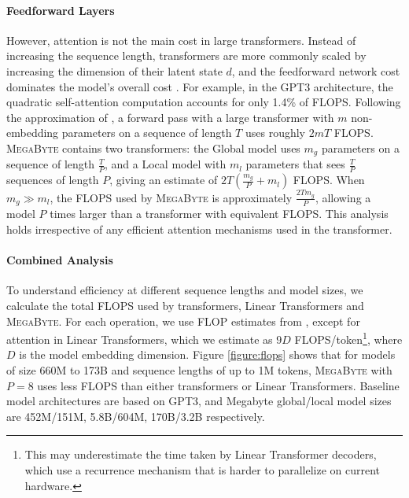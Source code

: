 \paragraph{Feedforward Layers} However, attention is not the main cost in large transformers. Instead of increasing the sequence length, transformers are more commonly scaled by increasing the dimension of their latent state $d$, and the feedforward network cost dominates the model's overall cost \citep{kaplan2020scaling}. For example, in the GPT3 architecture, the quadratic self-attention computation accounts for only 1.4\% of FLOPS. Following the approximation of \citep{kaplan2020scaling}, a forward pass with a large transformer with $m$ non-embedding parameters on a sequence of length $T$ uses roughly $2mT$ FLOPS. \textsc{MegaByte} contains two transformers: the Global model uses $m_g$ parameters on a sequence of length $\frac{T}{P}$, and a Local model with $m_l$ parameters that sees $\frac{T}{P}$ sequences of length $P$, giving an estimate of $2T(\frac{m_g}{P} + m_l)$ FLOPS. When $m_g\gg m_l$, the FLOPS used by \textsc{MegaByte} is approximately $\frac{2Tm_g}{P}$, allowing a model $P$ times larger than a transformer with equivalent FLOPS. This analysis holds irrespective of any efficient attention mechanisms used in the transformer.

\paragraph{Combined Analysis} To understand efficiency at different sequence lengths and model sizes, we calculate the total FLOPS used by transformers, Linear Transformers and \textsc{MegaByte}. For each operation, we use FLOP estimates from \citep{kaplan2020scaling}, except for attention in Linear Transformers, which we estimate as $9D$ FLOPS/token\footnote{This may underestimate the time taken by Linear Transformer decoders, which use a recurrence mechanism that is harder to parallelize on current hardware.}, where $D$ is the model embedding dimension. Figure \ref{figure:flops} shows that for models of size 660M to 173B and sequence lengths of up to 1M tokens, \textsc{MegaByte} with $P=8$ uses less FLOPS than either transformers or Linear Transformers. Baseline model architectures are based on GPT3, and Megabyte global/local model sizes are 452M/151M, 5.8B/604M, 170B/3.2B respectively.

